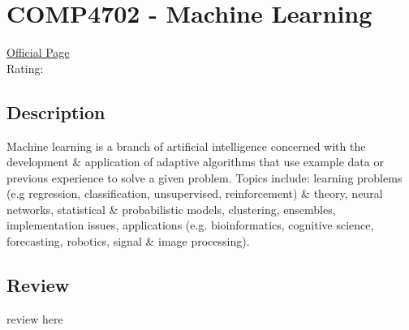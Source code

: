 \hypertarget{COMP4702}{\section{COMP4702 - Machine Learning}}

\large
\textcolor{turbo_purple}{\href{https://my.uq.edu.au/programs-courses/course.html?course_code=COMP4702}{Official Page}} \\
Rating: \cstar\cstar\cstar\cstar\ostar

\normalsize
\subsection*{Description}
Machine learning is a branch of artificial intelligence concerned with the development \& application of adaptive algorithms that use example data or previous experience to solve a given problem.
Topics include: learning problems (e.g regression, classification, unsupervised, reinforcement) \& theory, neural networks, statistical \& probabilistic models, clustering, ensembles, implementation issues, applications (e.g. bioinformatics, cognitive science, forecasting, robotics, signal \& image processing).

\subsection*{Review}
review here
